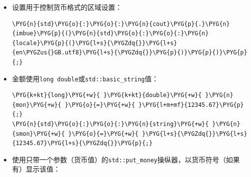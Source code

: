 \begin{itemize}
\item 设置用于控制货币格式的区域设置：



\begin{codeblockbg}
\begin{Verbatim}[commandchars=\\\{\},breaklines=true,breakanywhere=true,fontsize=\codefont,xleftmargin=17bp]
\PYG{n}{std}\PYG{o}{:}\PYG{o}{:}\PYG{n}{cout}\PYG{p}{.}\PYG{n}{imbue}\PYG{p}{(}\PYG{n}{std}\PYG{o}{:}\PYG{o}{:}\PYG{n}{locale}\PYG{p}{(}\PYG{l+s}{\PYGZdq{}}\PYG{l+s}{en\PYGZus{}GB.utf8}\PYG{l+s}{\PYGZdq{}}\PYG{p}{)}\PYG{p}{)}\PYG{p}{;}
\end{Verbatim}
\end{codeblockbg}



\item 金额使用\texttt{long double}或\texttt{std::\allowbreak{}basic\_\allowbreak{}string}值：



\begin{codeblockbg}
\begin{Verbatim}[commandchars=\\\{\},breaklines=true,breakanywhere=true,fontsize=\codefont,xleftmargin=17bp]
\PYG{k+kt}{long}\PYG{+w}{ }\PYG{k+kt}{double}\PYG{+w}{ }\PYG{n}{mon}\PYG{+w}{ }\PYG{o}{=}\PYG{+w}{ }\PYG{l+m+mf}{12345.67}\PYG{p}{;}
\PYG{n}{std}\PYG{o}{:}\PYG{o}{:}\PYG{n}{string}\PYG{+w}{ }\PYG{n}{smon}\PYG{+w}{ }\PYG{o}{=}\PYG{+w}{ }\PYG{l+s}{\PYGZdq{}}\PYG{l+s}{12345.67}\PYG{l+s}{\PYGZdq{}}\PYG{p}{;}
\end{Verbatim}
\end{codeblockbg}



\item 使用只带一个参数（货币值）的\texttt{std::\allowbreak{}put\_\allowbreak{}money}操纵器，以货币符号（如果有）显示该值：




\end{itemize}
